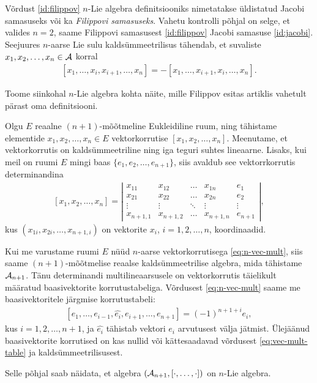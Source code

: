 Võrdust \eqref{id:filippov} $n$-Lie algebra definitsiooniks
nimetatakse üldistatud Jacobi samasuseks või ka
\emph{Filippovi samasuseks}. Vahetu kontrolli põhjal
on selge, et valides $n = 2$, saame Filippovi samasusest
\eqref{id:filippov} Jacobi samasuse \eqref{id:jacobi}. Seejuures
$n$-aarse Lie sulu kaldsümmeetrilisus tähendab, et
suvaliste $x_1, x_2, \dots, x_n \in \mathcal{A}$ korral
\begin{align}\label{def:n-lie-brac-antisymm}
    [x_1, \dots, x_i, x_{i+1}, \dots, x_n] =
    -[x_1, \dots, x_{i+1}, x_i, \dots, x_n].
\end{align}

Toome siinkohal $n$-Lie algebra kohta näite, mille
Filippov esitas artiklis \cite{filippov1985} vahetult
pärast oma definitsiooni.

\begin{naide}
    Olgu $E$ reaalne $(n+1)$-mõõtmeline Eukleidiline ruum,
    ning tähistame elementide $x_1, x_2, \dots, x_n \in E$
    vektorkorrutise $[x_1, x_2, \dots, x_n]$. Meenutame, 
    et vektorkorrutis on kaldsümmeetriline ning iga teguri
    suhtes lineaarne. Lisaks, kui meil on ruumi $E$ mingi
    baas $\{e_1, e_2, \dots, e_{n+1}\}$, siis avaldub see
    vektorrkorrutis determinandina
    \begin{align}\label{eq:n-vec-mult}
        [x_1, x_2, \dots, x_n] = \left|\begin{matrix}
          x_{11}    & x_{12}    & \dots  & x_{1n}    & e_1    \\
          x_{21}    & x_{22}    & \dots  & x_{2n}    & e_2    \\
          \vdots    & \vdots    & \ddots & \vdots    & \vdots \\
          x_{n+1,1} & x_{n+1,2} & \dots  & x_{n+1,n} & e_{n+1}
        \end{matrix}\right|,
    \end{align}
    kus $(x_{1i}, x_{2i}, \dots, x_{n+1,i})$ on vektorite
    $x_i$, $i = 1, 2, \dots, n$, koordinaadid.

    Kui me varustame ruumi $E$ nüüd $n$-aarse vektorkorrutisega
    \eqref{eq:n-vec-mult}, siis saame $(n+1)$-mõõtmelise
    reaalse kaldsümmeetrilise algebra, mida tähistame
    $\mathcal{A}_{n+1}$. Tänu determinandi multilineaarsusele on
    vektorkorrutis täielikult määratud baasivektorite
    korrutustabeliga. Võrdusest \eqref{eq:n-vec-mult} saame
    me baasivektoritele järgmise korrutustabeli:
    \begin{align}\label{eq:vec-mult-table}
        [e_1, \dots, e_{i-1}, \hat{e_i}, e_{i+1}, \dots, e_{n+1}]
        = (-1)^{n+1+i} e_i,
    \end{align}
    kus $i = 1, 2, \dots, n+1$, ja $\hat{e_i}$ tähistab
    vektori $e_i$ arvutusest välja jätmist. Ülejäänud
    baasivektorite korrutised on kas nullid või kättesaadavad
    võrdusest \eqref{eq:vec-mult-table} ja
    kaldsümmeetrilisusest.

    Selle põhjal saab näidata, et algebra
    $(\mathcal{A}_{n+1}, [\cdot, \dots, \cdot])$ on $n$-Lie
    algebra.\cite{filippov1985}
\end{naide}

